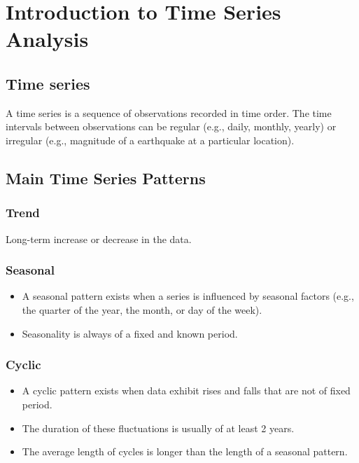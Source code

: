 \documentclass[
  11pt,
  a4paper,
]{report}
\begin{document}

\chapter{Introduction to Time Series
Analysis}\label{introduction-to-time-series-analysis}

\section{Time series}\label{time-series}

A time series is a sequence of observations recorded in time order. The
time intervals between observations can be regular (e.g., daily,
monthly, yearly) or irregular (e.g., magnitude of a earthquake at a
particular location).

\section{Main Time Series Patterns}\label{main-time-series-patterns}

\subsection{Trend}\label{trend}

Long-term increase or decrease in the data.

\subsection{Seasonal}\label{seasonal}

\begin{itemize}
\item
  A seasonal pattern exists when a series is influenced by seasonal
  factors (e.g., the quarter of the year, the month, or day of the
  week).
\item
  Seasonality is always of a fixed and known period.
\end{itemize}

\subsection{Cyclic}\label{cyclic}

\begin{itemize}
\item
  A cyclic pattern exists when data exhibit rises and falls that are not
  of fixed period.
\item
  The duration of these fluctuations is usually of at least 2 years.
\item
  The average length of cycles is longer than the length of a seasonal
  pattern.
\end{itemize}
\end{document}
